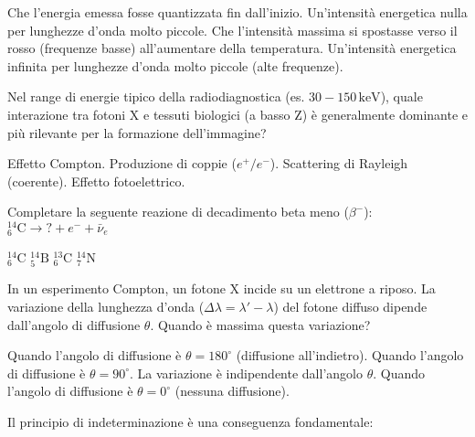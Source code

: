\documentclass{exam}%
\begin{document}
\begin{questions}
\vspace{0.2em}%
\begin{choices}%
\choice Che l'energia emessa fosse quantizzata fin dall'inizio.%
\choice Un'intensità energetica nulla per lunghezze d'onda molto piccole.%
\choice Che l'intensità massima si spostasse verso il rosso (frequenze basse) all'aumentare della temperatura.%
\choice Un'intensità energetica infinita per lunghezze d'onda molto piccole (alte frequenze).%
\end{choices}%
\question Nel range di energie tipico della radiodiagnostica (es. $30-150 \, \text{keV}$), quale interazione tra fotoni X e tessuti biologici (a basso Z) è generalmente dominante e più rilevante per la formazione dell'immagine?%
\vspace{0.2em}%
\begin{multicols}{2}%
\begin{choices}%
\choice Effetto Compton.%
\choice Produzione di coppie ($e^+/e^-$).%
\choice Scattering di Rayleigh (coerente).%
\choice Effetto fotoelettrico.%
\end{choices}%
\end{multicols}%
\question Completare la seguente reazione di decadimento beta meno ($\beta^-$): $^{14}_{6}\text{C} \rightarrow ? + e^- + \bar{\nu}_e$%
\vspace{0.2em}%
\begin{multicols}{4}%
\begin{choices}%
\choice $^{14}_{6}\text{C}$%
\choice $^{14}_{5}\text{B}$%
\choice $^{13}_{6}\text{C}$%
\choice $^{14}_{7}\text{N}$%
\end{choices}%
\end{multicols}%
\question In un esperimento Compton, un fotone X incide su un elettrone a riposo. La variazione della lunghezza d'onda ($\Delta \lambda = \lambda' - \lambda$) del fotone diffuso dipende dall'angolo di diffusione $\theta$. Quando è massima questa variazione?%
\vspace{0.2em}%
\begin{choices}%
\choice Quando l'angolo di diffusione è $\theta = 180^\circ$ (diffusione all'indietro).%
\choice Quando l'angolo di diffusione è $\theta = 90^\circ$.%
\choice La variazione è indipendente dall'angolo $\theta$.%
\choice Quando l'angolo di diffusione è $\theta = 0^\circ$ (nessuna diffusione).%
\end{choices}%
\question Il principio di indeterminazione è una conseguenza fondamentale:%
\vspace{0.2em}%
\begin{choices}%

\end{choices}
\end{questions}
\end{document}
